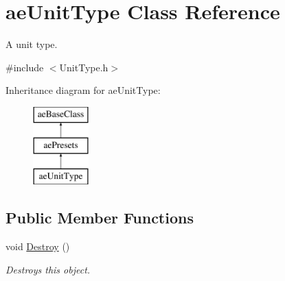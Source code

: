 \hypertarget{classae_unit_type}{}\section{ae\+Unit\+Type Class Reference}
\label{classae_unit_type}


A unit type.  




{\ttfamily \#include $<$Unit\+Type.\+h$>$}

Inheritance diagram for ae\+Unit\+Type\+:\begin{figure}[H]
\begin{center}
\leavevmode
\includegraphics[height=3.000000cm]{classae_unit_type}
\end{center}
\end{figure}
\subsection*{Public Member Functions}
\begin{DoxyCompactItemize}
\item 
void \hyperlink{classae_unit_type_a3cc8f03c8c3abb2893d1adcae0692059}{Destroy} ()\hypertarget{classae_unit_type_a3cc8f03c8c3abb2893d1adcae0692059}{}\label{classae_unit_type_a3cc8f03c8c3abb2893d1adcae0692059}

\begin{DoxyCompactList}\small\item\em Destroys this object. \end{DoxyCompactList}\end{DoxyCompactItemize}
